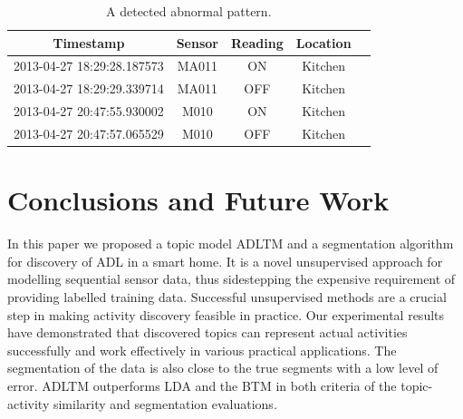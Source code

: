 \documentclass{article}
\begin{document}
{%
\begin{table}[!t]
\centering
\scriptsize
\begin{tabular}{ccccc}
\toprule
{\bf Timestamp}            & {\bf Sensor} & {\bf Reading} & {\bf Location}  \\ 
\midrule
2013-04-27 18:29:28.187573 & MA011        & ON            & Kitchen              \\ 
2013-04-27 18:29:29.339714 & MA011        & OFF           & Kitchen               \\ 
2013-04-27 20:47:55.930002 & M010         & ON            & Kitchen               \\ 
2013-04-27 20:47:57.065529 & M010         & OFF           & Kitchen                \\ 
\bottomrule
\end{tabular}
\caption{A detected abnormal pattern.}
\label{tab:outlier}
\end{table}

%
\section{Conclusions and Future Work}

In this paper we proposed a topic model \ac{ADLTM} and a segmentation algorithm for discovery of \acl{ADL} in a smart home. It is a novel unsupervised approach for modelling sequential sensor data, thus sidestepping the expensive requirement of providing labelled training data. Successful unsupervised methods are a crucial step in making activity discovery feasible in practice. 
Our experimental results have demonstrated that discovered topics can represent actual activities successfully and work effectively in various practical applications. The segmentation of the data is also close to the true segments with a low level of error. \ac{ADLTM} outperforms \acf{LDA} \cite{blei2003latent} and the \acf{BTM} \cite{wallach2006topic} in both criteria of the topic-activity similarity and segmentation evaluations.

}
\end{document}
